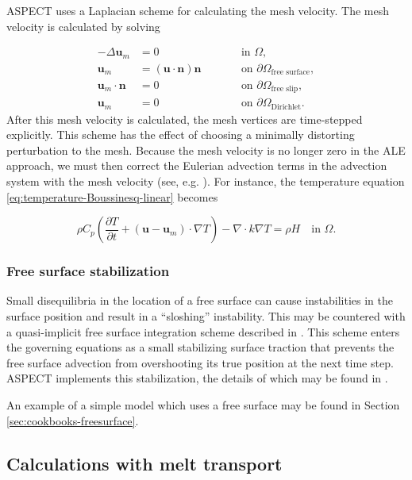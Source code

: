 \documentclass{article}
\newcommand{\aspect}{\textsc{ASPECT}}
\begin{document}
\aspect{} uses a Laplacian scheme for calculating the mesh velocity.  The mesh
velocity is calculated by solving

\begin{align}
-\Delta \textbf{u}_m &= 0 & \qquad & \textrm{in } \Omega, \\ 
\textbf{u}_m &= \left( \textbf{u} \cdot \textbf{n} \right) \textbf{n} & \qquad & \textrm{on } \partial \Omega_{\textrm{free surface}}, \\
\textbf{u}_m \cdot \textbf{n} &= 0 & \qquad & \textrm{on } \partial \Omega_{\textrm{free slip}}, \\
\textbf{u}_m &= 0 & \qquad & \textrm{on } \partial \Omega_{\textrm{Dirichlet}}.
\end{align}
After this mesh velocity is calculated, the mesh vertices are time-stepped explicitly.
This scheme has the effect of choosing a minimally distorting perturbation to the mesh.
Because the mesh velocity is no longer zero in the ALE approach, we must then correct
the Eulerian advection terms in the advection system with the mesh velocity (see, e.g.
\cite{DHPR2004}).  For instance, the temperature equation \eqref{eq:temperature-Boussinesq-linear}
becomes

\begin{equation*}
  \rho C_p \left(\frac{\partial T}{\partial t} + \left(\mathbf u - \mathbf u_m \right) \cdot\nabla T\right)
  - \nabla\cdot k\nabla T
  =
  \rho H
   \quad
   \textrm{in $\Omega$}.
\end{equation*}

\subsubsection{Free surface stabilization}

Small disequilibria in the location of a free surface can cause instabilities in
the surface position and result in a ``sloshing'' instability.  This may be countered with a
quasi-implicit free surface integration scheme described in \cite{KMM2010}.
This scheme enters the governing equations as a small stabilizing surface
traction that prevents the free surface advection from overshooting its
true position at the next time step.  \aspect{} implements this stabilization,
the details of which may be found in \cite{KMM2010}.

An example of a simple model which uses a free surface may be found in Section \ref{sec:cookbooks-freesurface}.

\subsection{Calculations with melt transport}
\label{sec:melt_transport}
\end{document}
